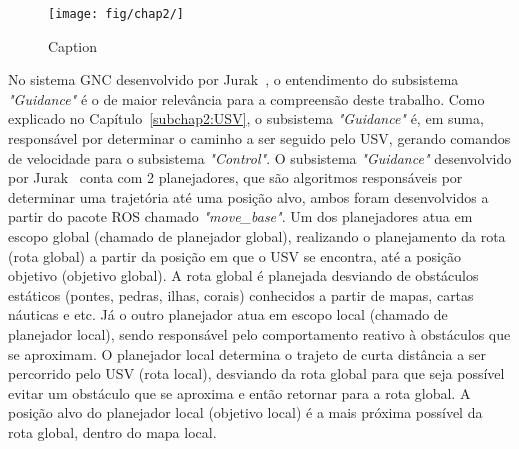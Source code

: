         \begin{figure}
            \centering
            \texttt{[image: fig/chap2/]}
            \caption{Caption}
            \label{fig:my_label}
        \end{figure}
        
        No sistema GNC desenvolvido por Jurak~\cite{Jurak2020COLREGS}, o entendimento do subsistema \textit{"Guidance"} é o de maior relevância para a compreensão deste trabalho. Como explicado no Capítulo~\ref{subchap2:USV}, o subsistema \textit{"Guidance"} é, em suma, responsável por determinar o caminho a ser seguido pelo USV, gerando comandos de velocidade para o subsistema \textit{"Control"}. O subsistema \textit{"Guidance"} desenvolvido por Jurak~\cite{Jurak2020COLREGS} conta com 2 planejadores, que são algoritmos responsáveis por determinar uma trajetória até uma posição alvo, ambos foram desenvolvidos a partir do pacote ROS chamado \textit{"move\_base"}. Um dos planejadores atua em escopo global (chamado de planejador global), realizando o planejamento da rota (rota global) a partir da posição em que o USV se encontra, até a posição objetivo (objetivo global). A rota global é planejada desviando de obstáculos estáticos (pontes, pedras, ilhas, corais) conhecidos a partir de mapas, cartas náuticas e etc. Já o outro planejador atua em escopo local (chamado de planejador local), sendo responsável pelo comportamento reativo à obstáculos que se aproximam. O planejador local determina o trajeto de curta 
        distância a ser percorrido pelo USV (rota local), desviando da rota global para que seja possível evitar um obstáculo que se aproxima e então retornar para a rota global. A posição alvo do planejador local (objetivo local) é a mais próxima possível da rota global, dentro do mapa local.

